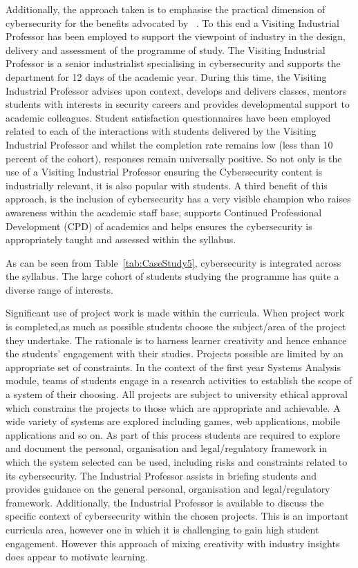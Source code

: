 \documentclass[conference]{IEEEtran}
\begin{document}
Additionally, the approach taken is to emphasise the practical dimension of cybersecurity for the benefits advocated by ~\cite{Weiss:2013:THC:2527148.2527180}. To this end a Visiting Industrial Professor has been employed to support the viewpoint of industry in the design, delivery and assessment of the programme of study. The Visiting Industrial Professor is a senior industrialist specialising in cybersecurity and supports the department for 12 days of the academic year. During this time, the Visiting Industrial Professor advises upon context, develops and delivers classes, mentors students with interests in security careers and provides developmental support to academic colleagues. Student satisfaction questionnaires have been employed related to each of the interactions with students delivered by the Visiting Industrial Professor and whilst the completion rate remains low (less than 10 percent of the cohort), responses remain universally positive. So not only is the use of a Visiting Industrial Professor ensuring the Cybersecurity content is industrially relevant, it is also popular with students. A third benefit of this approach, is the inclusion of cybersecurity has a very visible champion who raises awareness within the academic staff base, supports Continued Professional Development (CPD) of academics and helps ensures the cybersecurity is appropriately taught and assessed within the syllabus.

As can be seen from Table~{\ref{tab:CaseStudy5}}, cybersecurity is integrated across the syllabus. The  large cohort of students studying the programme has quite a diverse range of interests. 

Significant use of project work is made within the curricula. When project work is completed,as much as possible students choose the subject/area of the project they undertake. The rationale is to harness learner creativity {\cite{Bradley2020}} and hence enhance the students' engagement with their studies. Projects possible are limited by an appropriate set of constraints. In the context of the first year Systems Analysis module, teams of students engage in a research activities  to establish the scope of a system of their choosing. All projects are subject to university ethical approval which constrains the projects to those which are appropriate and achievable. A wide variety of systems are explored including games, web applications, mobile applications and so on. As part of this process students are required to explore and document the personal, organisation and legal/regulatory framework in which the system selected can be used, including risks and constraints related to its cybersecurity. The Industrial Professor assists in briefing students and provides guidance on the general personal, organisation and legal/regulatory framework. Additionally, the Industrial Professor is available to discuss the specific context of cybersecurity within the chosen projects. This is an important curricula area, however one in which it is challenging to gain high student engagement. However this approach of mixing creativity with industry insights does appear to motivate learning. 
\end{document}
